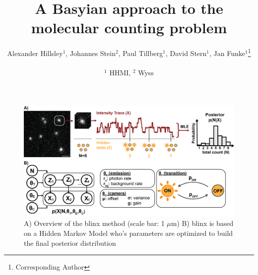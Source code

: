 \documentclass[twocolumn]{article}
\begin{document}
\title{A Basyian approach to the molecular counting problem}

\author{
  Alexander Hillsley$^{1}$,
  Johannes Stein$^{2}$,
  Paul Tillberg$^{1}$,
  David Stern$^{1}$,
  Jan Funke$^{1}$\thanks{Corresponding Author}
  \\\\
  \normalsize{$^1$ HHMI},
  \normalsize{$^2$ Wyss}
}

\maketitle





\begin{figure}
  \includegraphics[width=\linewidth]{figures/blinx_overview.png}
  \caption{A) Overview of the blinx method (scale bar: 1 $\mu$m) B) blinx is based on a Hidden Markov Model who's parameters are optimized to build the final posterior
  distribution}
  \label{fig:method:overview}
\end{figure}


\end{document}
